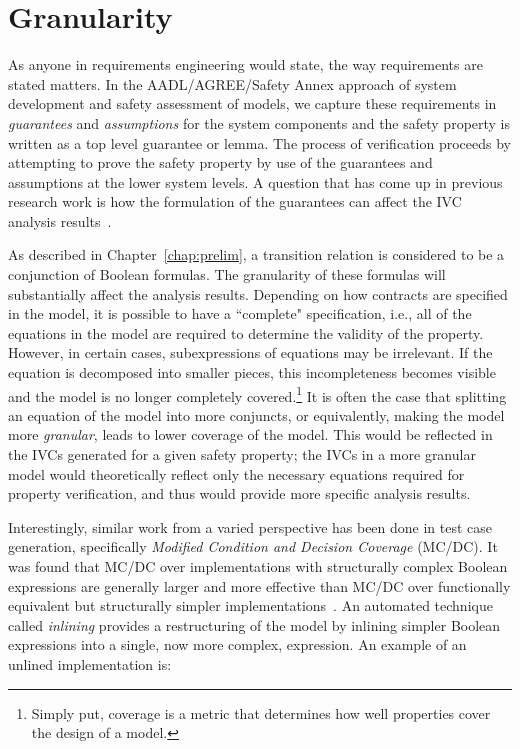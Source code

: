 \chapter{Granularity}
\label{chap:granularity}
As anyone in requirements engineering would state, the way requirements are stated matters. In the AADL/AGREE/Safety Annex approach of system development and safety assessment of models, we capture these requirements in \emph{guarantees} and \emph{assumptions} for the system components and the safety property is written as a top level guarantee or lemma. The process of verification proceeds by attempting to prove the safety property by use of the guarantees and assumptions at the lower system levels. A question that has come up in previous research work is how the formulation of the guarantees can affect the IVC analysis results~\cite{ghassabani_2018}. 

As described in Chapter~\ref{chap:prelim}, a transition relation is considered to be a conjunction of Boolean formulas. The granularity of these formulas will substantially affect the analysis results. Depending on how contracts are specified in the model, it is possible to have a ``complete" specification, i.e., all of the equations in the model are required to determine the validity of the property. However, in certain cases, subexpressions of equations may be irrelevant. If the equation is decomposed into smaller pieces, this incompleteness becomes visible and the model is no longer completely covered.\footnote{Simply put, coverage is a metric that determines how well properties cover the design of a model.} It is often the case that splitting an equation of the model into more conjuncts, or equivalently, making the model more \textit{granular}, leads to lower coverage of the model. This would be reflected in the IVCs generated for a given safety property; the IVCs in a more granular model would theoretically reflect only the necessary equations required for property verification, and thus would provide more specific analysis results.

Interestingly, similar work  from a varied perspective has been done in test case generation, specifically \emph{Modified Condition and Decision Coverage} (MC/DC). It was found that MC/DC over implementations with structurally complex Boolean expressions are generally larger and more effective than MC/DC over functionally equivalent but structurally simpler implementations~\cite{gay2016effect}. An automated technique called \emph{inlining} provides a restructuring of the model by inlining simpler Boolean expressions into a single, now more complex, expression. An example of an unlined implementation is: 

